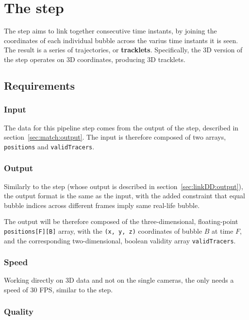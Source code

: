 \chapter{The \linkDDD* step}
\label{chap:3dlink}

The \link* step aims to link together consecutive time instants, by joining the coordinates of each individual bubble across the varius time instants it is seen.
The result is a series of trajectories, or \textbf{tracklets}.
Specifically, the 3D version of the \link* step operates on 3D coordinates, producing 3D tracklets.

\section{Requirements}

\subsection{Input}

The data for this pipeline step comes from the output of the \match* step, described in section~\ref{sec:match:output}.
The input is therefore composed of two arrays, \texttt{positions} and \texttt{validTracers}.

\subsection{Output}

Similarly to the \linkDD* step (whose output is described in section~\ref{sec:linkDD:output}), the output format is the same as the input, with the added constraint that equal bubble indices across different frames imply same real-life bubble.

The output will be therefore composed of the three-dimensional, floating-point \texttt{positions[F][B]} array, with the \texttt{(x, y, z)} coordinates of bubble $B$ at time $F$, and the corresponding two-dimensional, boolean validity array \texttt{validTracers}.

\subsection{Speed}

Working directly on 3D data and not on the single cameras, the \linkDDD* only needs a speed of 30 FPS, similar to the \match* step.

\subsection{Quality}

